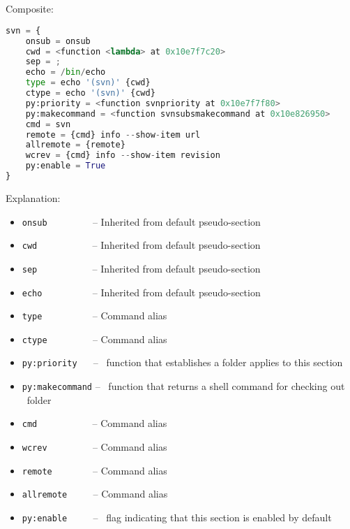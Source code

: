 \subsubsection*{\svn\ \Linux}

Composite:

\begin{snugshade}
\begin{lstlisting}[language=python]
svn = {
	onsub = onsub
	cwd = <function <lambda> at 0x10e7f7c20>
	sep = ;
	echo = /bin/echo
	type = echo '(svn)' {cwd}
	ctype = echo '(svn)' {cwd}
	py:priority = <function svnpriority at 0x10e7f7f80>
	py:makecommand = <function svnsubsmakecommand at 0x10e826950>
	cmd = svn
	remote = {cmd} info --show-item url
	allremote = {remote}
	wcrev = {cmd} info --show-item revision
	py:enable = True
}
\end{lstlisting}
\end{snugshade}

Explanation:

\begin{itemize}
\item \lstinline{onsub} ~~~~~~~~ -- Inherited from default pseudo-section
\item \lstinline{cwd} ~~~~~~~~~~ -- Inherited from default pseudo-section
\item \lstinline{sep} ~~~~~~~~~~ -- Inherited from default pseudo-section
\item \lstinline{echo} ~~~~~~~~~ -- Inherited from default pseudo-section
\item \lstinline{type} ~~~~~~~~~ -- Command alias
\item \lstinline{ctype} ~~~~~~~~ -- Command alias
\item \lstinline{py:priority} ~~ -- \Python\ function that establishes a folder applies to this section
\item \lstinline{py:makecommand} -- \Python\ function that returns a shell command for checking out \svn\ folder
\item \lstinline{cmd} ~~~~~~~~~~ -- Command alias
\item \lstinline{wcrev} ~~~~~~~~ -- Command alias
\item \lstinline{remote} ~~~~~~~ -- Command alias
\item \lstinline{allremote} ~~~~ -- Command alias
\item \lstinline{py:enable} ~~~~ -- \Python\ flag indicating that this section is enabled by default
\end{itemize}

